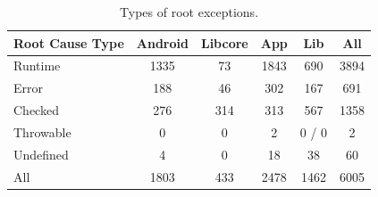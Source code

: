 \documentclass[conference]{IEEEtran}
\begin{document}


\begin{table}
\centering
\begin{tabular}{lccccc}
    \hline
    \bfseries{Root Cause Type} & \bfseries{Android} & \bfseries{Libcore} & \bfseries{App} & \bfseries{Lib}  & \bfseries{All}\\
    \hline

Runtime	&	1335	&	73	&	1843	&	690  &	3894\\
Error	       &	 188              &	 46	&	302             &	167	           &	691	\\
Checked	&	276           &	314	&	313          &	567	           &	1358	\\
Throwable	&	0	       &	0	&	2            &	0	     / 0               &	2	\\
Undefined	&	4	&	0	&	18		&	38	   &	60	\\
 \hline
All		& 1803	&	433	&	2478	&	1462	&	6005	\\
    \hline
  \end{tabular}
\caption{Types of root exceptions.}
  \label{tab:typeroottab}
\end{table}

\end{document}
